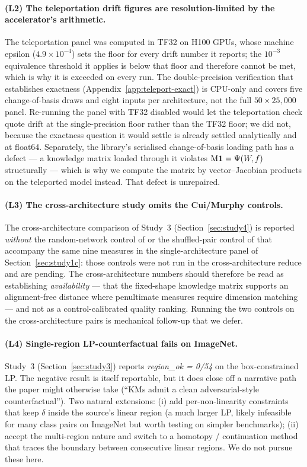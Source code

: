 \paragraph{(L2) The teleportation drift figures are resolution-limited by the
accelerator's arithmetic.}
The teleportation panel was computed in TF32 on H100 GPUs, whose machine epsilon
($4.9\times10^{-4}$) sets the floor for every drift number it reports; the
$10^{-3}$ equivalence threshold it applies is below that floor and therefore
cannot be met, which is why it is exceeded on every run. The double-precision
verification that establishes exactness (Appendix~\ref{app:teleport-exact}) is
CPU-only and covers five change-of-basis draws and eight inputs per architecture,
not the full $50\times25{,}000$ panel. Re-running the panel with TF32 disabled
would let the teleportation check quote drift at the single-precision floor rather than the TF32
floor; we did not, because the exactness question it would settle is already
settled analytically and at float64. Separately, the library's serialised
change-of-basis loading path has a defect --- a knowledge matrix loaded through it
violates $\mathrm{M}\mathbf 1=\Psi(W\!,f)$ structurally --- which is why we compute the matrix by
vector--Jacobian products on the teleported model instead. That defect is
unrepaired.

\paragraph{(L3) The cross-architecture study omits the Cui/Murphy controls.}
The cross-architecture comparison of Study~3 (Section~\ref{sec:study4})
is reported \emph{without} the random-network control of
\citet{cui2022deconfounded} or the shuffled-pair control of
\citet{murphy2024debiased} that accompany the same nine measures in the
single-architecture panel of Section~\ref{sec:study1c}: those controls
were not run in the cross-architecture reduce and are pending. The
cross-architecture numbers should therefore be read as establishing
\emph{availability} --- that the fixed-shape knowledge matrix supports an
alignment-free distance where penultimate measures require dimension
matching --- and not as a control-calibrated quality ranking. Running
the two controls on the cross-architecture pairs is mechanical follow-up
that we defer.

\paragraph{(L4) Single-region LP-counterfactual fails on ImageNet.}
Study~3 (Section~\ref{sec:study3}) reports
\emph{region\_ok = 0/54} on the box-constrained LP. The negative result
is itself reportable, but it does close off a narrative path the paper
might otherwise take (``KMs admit a clean adversarial-style
counterfactual''). Two natural extensions: (i) add per-non-linearity
constraints that keep $\delta$ inside the source's linear region (a
much larger LP, likely infeasible for many class pairs on ImageNet but
worth testing on simpler benchmarks); (ii) accept the multi-region
nature and switch to a homotopy / continuation method that traces the
boundary between consecutive linear regions. We do not pursue these
here.

